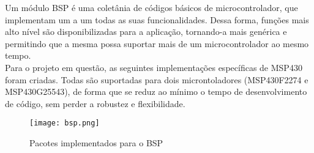 Um módulo BSP é uma coletânia de códigos básicos de microcontrolador, que implementam um a um todas as suas funcionalidades. Dessa forma, funções mais alto nível são disponibilizadas para a aplicação, tornando-a mais genérica e permitindo que a mesma possa suportar mais de um microcontrolador ao mesmo tempo. \\
Para o projeto em questão, as seguintes implementações específicas de MSP430 foram criadas. Todas são suportadas para dois microntoladores (MSP430F2274 e MSP430G25543), de forma que se reduz ao mínimo o tempo de desenvolvimento de código, sem perder a robustez e flexibilidade.

\begin{figure}[htbp]
	\centering
		\texttt{[image: bsp.png]}
	\caption{Pacotes implementados para o BSP}
	\label{bsp-scheme}
\end{figure}
